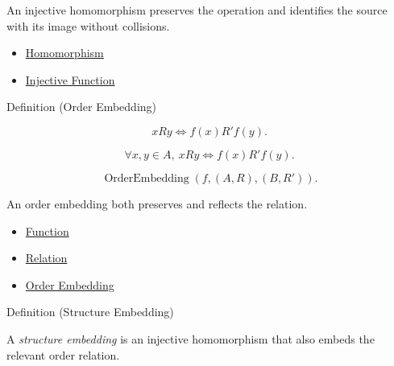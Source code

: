 \begin{remark*}[Interpretation]
An injective homomorphism preserves the operation and identifies the source
with its image without collisions.
\end{remark*}

\begin{dependencies}
\begin{itemize}
  \item \hyperref[def:homomorphism]{Homomorphism}
  \item \hyperref[def:injective]{Injective Function}
\end{itemize}
\end{dependencies}

\begin{definitionbox}{Definition (Order Embedding)}
\begin{definition}
\label{def:abstract-order-embedding}
\[
xRy \Longleftrightarrow f(x)R'f(y).
\]
\end{definition}
\end{definitionbox}

\begin{remark*}
\[
\forall x,y\in A,\ xRy \Longleftrightarrow f(x)R'f(y).
\]
\end{remark*}

\begin{remark*}
\[
\operatorname{OrderEmbedding}(f,(A,R),(B,R')).
\]
\end{remark*}

\begin{remark*}[Interpretation]
An order embedding both preserves and reflects the relation.
\end{remark*}

\begin{dependencies}
\begin{itemize}
  \item \hyperref[def:function]{Function}
  \item \hyperref[def:relation]{Relation}
  \item \hyperref[def:order-embedding]{Order Embedding}
\end{itemize}
\end{dependencies}

\begin{definitionbox}{Definition (Structure Embedding)}
\begin{definition}
\label{def:structure-embedding}
A \emph{structure embedding} is an injective homomorphism that also embeds the
relevant order relation.
\end{definition}
\end{definitionbox}

